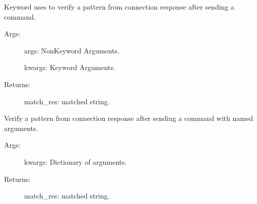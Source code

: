 \documentclass[letterpaper,10pt,english]{sphinxmanual}
\begin{document}
\begin{fulllineitems}
\begin{fulllineitems}
\begin{description}
\end{description}

\end{fulllineitems}


\begin{fulllineitems}
\label{\detokenize{QConnectBase:QConnectBase.connection_manager.ConnectionManager.verify}}
\sphinxAtStartPar
Keyword uses to verify a pattern from connection response after sending a command.
\begin{description}
\item[{Args:}] \leavevmode
\sphinxAtStartPar
args:   Non\sphinxhyphen{}Keyword Arguments.

\sphinxAtStartPar
kwargs:   Keyword Arguments.

\item[{Returns:}] \leavevmode
\sphinxAtStartPar
match\_res: matched string.

\end{description}

\end{fulllineitems}


\begin{fulllineitems}
\label{\detokenize{QConnectBase:QConnectBase.connection_manager.ConnectionManager.verify_named_args}}
\sphinxAtStartPar
Verify a pattern from connection response after sending a command with named arguments.
\begin{description}
\item[{Args:}] \leavevmode
\sphinxAtStartPar
kwargs: Dictionary of arguments.

\item[{Returns:}] \leavevmode
\sphinxAtStartPar
match\_res: matched string.

\end{description}


\end{fulllineitems}
\end{fulllineitems}
\end{document}
